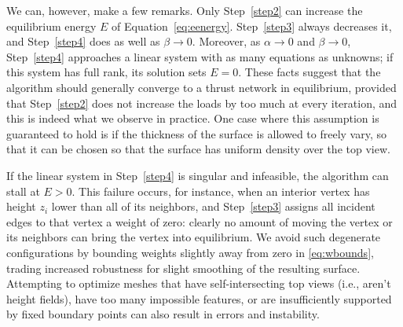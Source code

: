 \documentclass[review]{acmsiggraph}
\begin{document}
We can, however, make a few remarks. Only Step~\ref{step2} can 
increase the equilibrium
 energy $E$ of Equation~\eqref{eq:eenergy}.
Step~\ref{step3} always decreases it, and Step~\ref{step4} does as well as $\beta \to 0$. Moreover, as $\alpha
\to 0$ and $\beta \to 0$, Step~\ref{step4} approaches a linear system with
as many equations as unknowns; if this system has full rank, its solution
sets $E=0$. These facts suggest that the algorithm should generally
converge to a thrust network in equilibrium, provided that
Step~\ref{step2} does not increase the loads by too much at every
iteration, and this is indeed what we observe in practice. One case where
this assumption is guaranteed to hold is if the thickness of the surface
is allowed to freely vary, so that it can be chosen so that the surface
has uniform density over the top view.

If the linear system in Step~\ref{step4} is singular and infeasible, the
algorithm can stall at $E > 0$. This failure occurs, for instance, when an
interior vertex has height $z_i$ lower than all of its neighbors, and
Step~\ref{step3} assigns all incident edges to that vertex a weight of
zero: clearly no amount of moving the vertex or its neighbors can bring
the vertex into equilibrium. We avoid such degenerate configurations by
bounding weights slightly away from zero in \eqref{eq:wbounds}, trading
increased robustness for slight smoothing of the resulting surface. Attempting
to optimize meshes that have self-intersecting top views (i.e., aren't height fields),
have too many impossible features, or are insufficiently supported by fixed
boundary points can also result in errors and instability.

\end{document}
